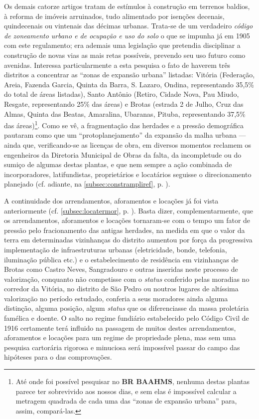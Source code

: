 Os demais catorze artigos tratam de estímulos à construção em terrenos baldios, à reforma de imóveis arruinados, tudo alimentado por isenções decenais, quindecenais ou vintenais das décimas urbanas. Trata-se de um verdadeiro \textit{código de zoneamento urbano e de ocupação e uso do solo} o que se impunha já em 1905 com este regulamento; era ademais uma legislação que pretendia disciplinar a construção de novas vias as mais retas possíveis, prevendo seu uso futuro como avenidas. Interessa particularmente a esta pesquisa o fato de haverem três distritos a concentrar as ``zonas de expansão urbana'' listadas: Vitória (Federação, Areia, Fazenda Garcia, Quinta da Barra, S. Lazaro, Ondina, representando 35,5\% do total de áreas listadas), Santo Antônio (Retiro, Cidade Nova, Pau Miudo, Resgate, representando 25\% das áreas) e Brotas (estrada 2 de Julho, Cruz das Almas, Quinta das Beatas, Amaralina, Ubaranas, Pituba, representando 37,5\% das áreas)\footnote{Até onde foi possível pesquisar no \textbf{BR BAAHMS}, nenhuma destas plantas parece ter sobrevivido aos nossos dias, e sem elas é impossível calcular a metragem quadrada de cada uma das ``zonas de expansão urbana'' para, assim, compará-las.}. Como se vê, a fragmentação das herdades e a pressão demográfica pautaram como que um ``protoplanejamento'' da expansão da malha urbana ---  ainda que, verificando-se as licenças de obra, em diversos momentos reclamem os engenheiros da Diretoria Municipal de Obras da falta, da incompletude ou do sumiço de algumas destas plantas, e que nem sempre a ação combinada de incorporadores, latifundistas, proprietários e locatários seguisse o direcionamento planejado (cf. adiante, na \autoref{subsec:constrampliref}, p. \pageref{subsec:constrampliref}). 

A continuidade dos arrendamentos, aforamentos e locações já foi vista anteriormente (cf. \autoref{subsec:locatermor}, p. \pageref{subsec:locatermor}). Basta dizer, complementarmente, que os arrendamentos, aforamentos e locações tornaram-se com o tempo um fator de pressão pelo fracionamento das antigas herdades, na medida em que o valor da terra em determinadas vizinhanças do distrito aumentou por força da progressiva implementação de infraestruturas urbanas (eletricidade, bonde, telefonia, iluminação pública etc.) e o estabelecimento de residência em vizinhanças de Brotas como Castro Neves, Sangradouro e outras inseridas neste processo de valorização, conquanto não competisse com o \textit{status} conferido pelas moradias no corredor da Vitória, no distrito de São Pedro ou noutros lugares de altíssima valorização no período estudado, conferia a seus moradores ainda alguma distinção, alguma posição, algum \textit{status} que os diferenciasse da massa proletária famélica e doente. O salto no regime fundiário estabelecido pelo Código Civil de 1916 certamente terá influido na passagem de muitos destes arrendamentos, aforamentos e locações para um regime de propriedade plena, mas sem uma pesquisa cartorária rigorosa e minuciosa será impossível passar do campo das hipóteses para o das comprovações.

